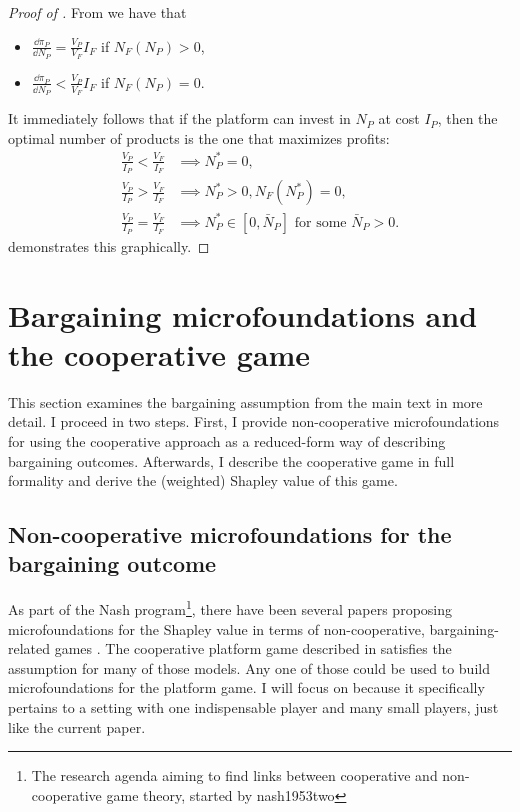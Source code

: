 \begin{proof}[Proof of ]
    From  we have that
    \begin{itemize}
        \item $\frac{\dd \pi_P}{\dd N_P} = \frac{V_P}{V_F} I_F$ if $N_F(N_P) > 0$,
        \item $\frac{\dd \pi_P}{\dd N_P} < \frac{V_P}{V_F} I_F$ if $N_F(N_P) = 0$.
    \end{itemize}
    It immediately follows that if the platform can invest in $N_P$ at cost $I_P$, then the optimal number of products is the one that maximizes profits:
    \begin{align*}
        \frac{V_P}{I_P} < \frac{V_F}{I_F} &\implies N_P^* = 0, \\
        \frac{V_P}{I_P} > \frac{V_F}{I_F} &\implies N_P^* > 0, N_F(N_P^*) = 0, \\
        \frac{V_P}{I_P} = \frac{V_F}{I_F} &\implies N_P^* \in [0, \bar{N}_P] \text{ for some } \bar{N}_P > 0.
    \end{align*}
     demonstrates this graphically.
\end{proof}

\section{Bargaining microfoundations and the cooperative game}
This section examines the bargaining assumption from the main text in more detail.
I proceed in two steps.
First, I provide non-cooperative microfoundations for using the cooperative approach as a reduced-form way of describing bargaining outcomes.
Afterwards, I describe the cooperative game in full formality and derive the (weighted) Shapley value of this game.

\subsection{Non-cooperative microfoundations for the bargaining outcome}
\label{sec:bargaining_microfoundation}

As part of the Nash program\footnote{
    The research agenda aiming to find links between cooperative and non-cooperative game theory, started by nash1953two
}, there have been several papers proposing microfoundations for the Shapley value in terms of non-cooperative, bargaining-related games \parencite[e.g.][]{gul1989bargaining,winter1994demand,hart1996bargaining,stole1996intra}.
The cooperative platform game described in  satisfies the assumption for many of those models.
Any one of those could be used to build microfoundations for the platform game.
I will focus on \textcite{stole1996intra} because it specifically pertains to a setting with one indispensable player and many small players, just like the current paper.

